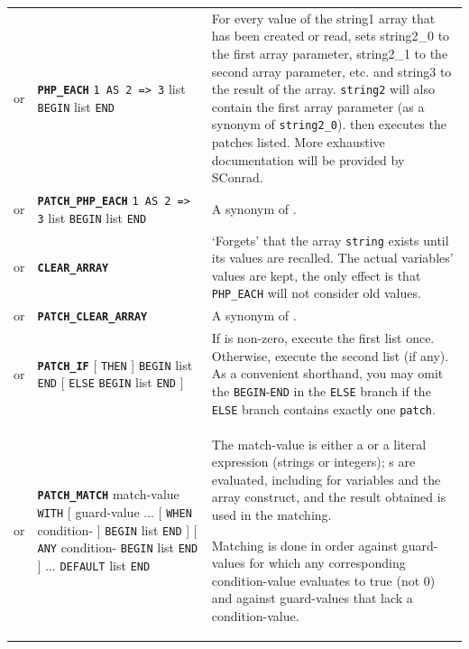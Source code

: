 \documentclass{article}
\def\ttref#1{\ahrefloc{#1}{\tt #1}}
\def\DEFINE#1{{\tt \bf #1}\label{#1}\index{#1}}
\def\t#1{{\tt #1}}
\def\Slist{{\color{red} list }}
\def\Ob{{\color{red} [ }}
\def\Oe{{\color{red} ] }}
\begin{document}
\begin{tabular}{cp{10in}|p{10in}}
or & \DEFINE{PHP_EACH} \t{\ttref{String}1 AS \ttref{String}2 => \ttref{String}3} \Slist
                       \t{BEGIN} \ttref{patch} \Slist \t{END} &
    For every value of the string1 array that has been created or read, sets
    string2_0 to the first array parameter, string2_1 to the second array
    parameter, etc. and string3 to the result of the array. \verb+string2+ will also contain
		the first array parameter (as a synonym of \verb+string2_0+). then executes the
    patches listed. More exhaustive documentation will be provided by SConrad.
\\

or & \DEFINE{PATCH_PHP_EACH} \t{\ttref{String}1 AS \ttref{String}2 => \ttref{String}3} \Slist
                             \t{BEGIN} \ttref{patch} \Slist \t{END} &
    A synonym of \ttref{PHP_EACH}.
\\

or & \DEFINE{CLEAR_ARRAY} \ttref{String} &
    `Forgets' that the array \t{string} exists until its values are recalled.
    The actual variables' values are kept, the only effect is that \t{*PHP_EACH}
    will not consider old values.
\\

or & \DEFINE{PATCH_CLEAR_ARRAY} \ttref{String} &
    A synonym of \ttref{CLEAR_ARRAY}.
\\


or & \DEFINE{PATCH_IF} \ttref{value} \Ob \t{THEN} \Oe \t{BEGIN}
  \ttref{patch} \Slist \t{END}
  \Ob \t{ELSE} \t{BEGIN} \ttref{patch} \Slist \t{END} \Oe
  &
  If \ttref{value} is non-zero, execute the first \ttref{patch} \Slist
  once. Otherwise, execute the second \ttref{patch} \Slist (if any). As a
  convenient shorthand, you may omit the \t{BEGIN}-\t{END} in the \t{ELSE}
  branch if the \t{ELSE} branch contains exactly one \t{patch}.
  \\
  or & \DEFINE{PATCH_MATCH} match-value \t{WITH} \Ob guard-value ...
    \Ob \t{WHEN} condition-\ttref{value} \Oe \t{BEGIN} \ttref{patch}
    \Slist \t{END} \Oe \Ob \t{ANY} condition-\ttref{value} \t{BEGIN}
    \ttref{patch} \Slist \t{END} \Oe ... \t{DEFAULT} \ttref{patch}
    \Slist \t{END} &

    The match-value is either a \ttref{value} or a literal expression
    (strings or integers); \ttref{value}s are evaluated, including for
    variables and the array construct, and the result obtained is used
    in the matching.

    Matching is done in order against guard-values for which any
    corresponding condition-value evaluates to true (not 0) and against
    guard-values that lack a condition-value.


\end{tabular}
\end{document}
